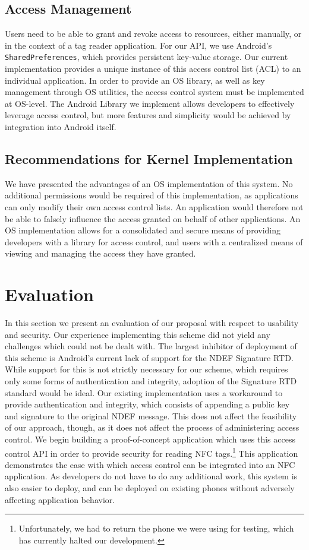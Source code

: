 \documentclass[12pt]{article}
\begin{document}
\subsection{Access Management}
Users need to be able to grant and revoke access to resources, either manually, or in the context of a tag reader application.
For our API, we use Android's \texttt{SharedPreferences}, which provides persistent key-value storage.
Our current implementation provides a unique instance of this access control list (ACL) to an individual application.
In order to provide an OS library, as well as key management through OS utilities, the access control system must be implemented at OS-level.
The Android Library we implement allows developers to effectively leverage access control, but more features and simplicity would be achieved by integration into Android itself.

\subsection{Recommendations for Kernel Implementation}
We have presented the advantages of an OS implementation of this system.
No additional permissions would be required of this implementation, as applications can only modify their own access control lists.
An application would therefore not be able to falsely influence the access granted on behalf of other applications.
An OS implementation allows for a consolidated and secure means of providing developers with a library for access control, and users with a centralized means of viewing and managing the access they have granted.

\section{Evaluation}
In this section we present an evaluation of our proposal with respect to usability and security.
Our experience implementing this scheme did not yield any challenges which could not be dealt with.
The largest inhibitor of deployment of this scheme is Android's current lack of support for the NDEF Signature RTD.
While support for this is not strictly necessary for our scheme, which requires only some forms of authentication and integrity, adoption of the Signature RTD standard would be ideal.
Our existing implementation uses a workaround to provide authentication and integrity, which consists of appending a public key and signature to the original NDEF message.
This does not affect the feasibility of our approach, though, as it does not affect the process of administering access control.
We begin building a proof-of-concept application which uses this access control API in order to provide security for reading NFC tags.\footnote{Unfortunately, we had to return the phone we were using for testing, which has currently halted our development.}
This application demonstrates the ease with which access control can be integrated into an NFC application.
As developers do not have to do any additional work, this system is also easier to deploy, and can be deployed on existing phones without adversely affecting application behavior.
\end{document}
